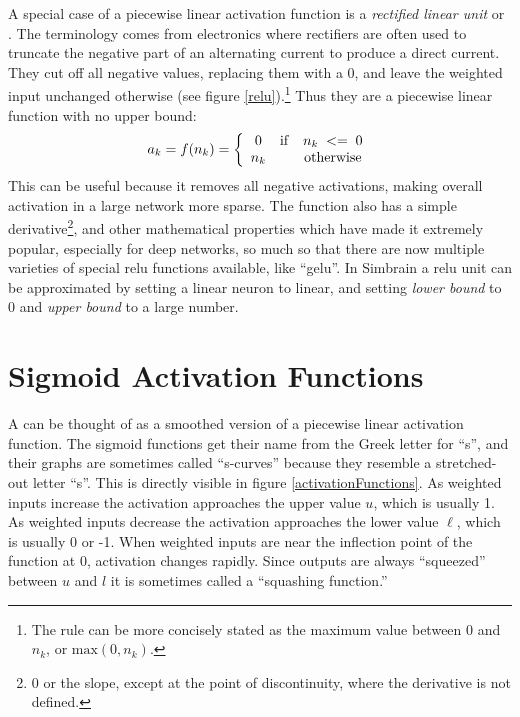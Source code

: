 A special case of a piecewise linear activation function is a \emph{rectified linear unit} or . The terminology comes from electronics where rectifiers are often used to truncate the negative part of an alternating current to produce a direct current. They cut off all negative values, replacing them with a 0, and leave the weighted input unchanged otherwise (see figure \ref{relu}).\footnote{The rule can be more concisely stated as the maximum value between 0 and $n_k$, or $\mbox{max}(0,n_k)$.} Thus they are a piecewise linear function with no upper bound:
\begin{eqnarray*}
a_k = f(n_k) =  
\left\{
      \begin{array}{clc}
                  0      & {\rm if} &   n_k\; <= \; 0          \\  
              n_k  &  &  \mbox{otherwise}	
      \end{array} 
\right.
\end{eqnarray*}
This can be useful because it removes all negative activations, making overall activation in a large network more sparse. The function also has a simple derivative\footnote{0 or the slope, except at the point of discontinuity, where the derivative is not defined.}, and other mathematical properties which have made it extremely popular, especially for deep networks, so much so that there are now multiple varieties of special relu functions available, like ``gelu''. In Simbrain a relu unit can be approximated by setting a linear neuron to linear, and setting \emph{lower bound} to 0 and \emph{upper bound} to a large number.

\section{Sigmoid Activation Functions}


A  can be thought of as a smoothed version of a piecewise linear activation function. The sigmoid functions get their name from the Greek letter for ``s'', and their graphs are sometimes called ``s-curves'' because they resemble a stretched-out letter ``s''. This is directly visible in figure \ref{activationFunctions}. As weighted inputs increase the activation approaches the upper value $u$, which is usually 1. As weighted inputs decrease the activation approaches the lower value $\ell$, which is usually 0 or -1. When weighted inputs are near the inflection point of the function at 0, activation changes rapidly. Since outputs are always ``squeezed'' between $u$ and $l$ it is sometimes called a ``squashing function.''

